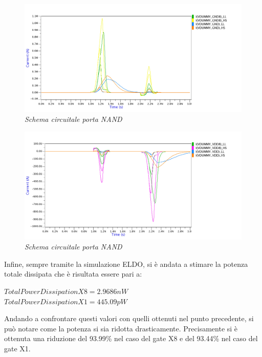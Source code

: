 \begin{figure}[!htb]
	\centering
	\includegraphics[scale=0.12]{immagini/onde_5_4_current2}
	\caption{\textit{Schema circuitale porta NAND}}
	\label{onde_5_4_current2}
\end{figure}
\newpage
\begin{figure}[!htb]
	\centering
	\includegraphics[scale=0.12]{immagini/onde_5_4_current3}
	\caption{\textit{Schema circuitale porta NAND}}
	\label{onde_5_4_current3}
\end{figure}
\noindent Infine, sempre tramite la simulazione ELDO, si è andata a stimare la potenza totale dissipata che è risultata essere pari a:
\begin{center}
	$Total Power Dissipation X8 = 2.9686 nW $ \\
	$Total Power Dissipation X1 = 445.09 pW $
\end{center}
Andando a confrontare questi valori con quelli ottenuti nel punto precedente, si può notare come la potenza si sia ridotta drasticamente. Precisamente si è ottenuta una riduzione del 93.99\% nel caso del gate X8 e del 93.44\% nel caso del gate X1.

